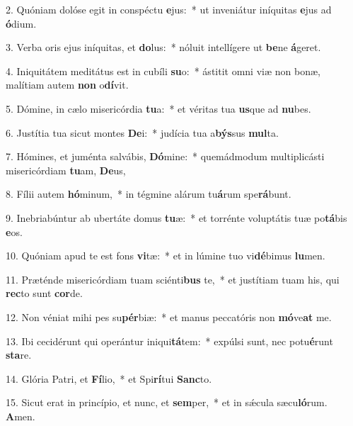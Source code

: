 2. Quóniam dolóse egit in conspéctu \textbf{e}jus:~*  ut inveniátur iníquitas \textbf{e}jus ad \textbf{ó}dium.\

3. Verba oris ejus iníquitas, et \textbf{do}lus:~*  nóluit intellígere ut \textbf{be}ne \textbf{á}geret.\

4. Iniquitátem meditátus est in cubíli \textbf{su}o:~*  ástitit omni viæ non bonæ, malítiam autem \textbf{non} o\textbf{dí}vit.\

5. Dómine, in cælo misericórdia \textbf{tu}a:~*  et véritas tua \textbf{us}que ad \textbf{nu}bes.\

6. Justítia tua sicut montes \textbf{De}i:~*  judícia tua a\textbf{býs}sus \textbf{mul}ta.\

7. Hómines, et juménta salvábis, \textbf{Dó}mine:~*  quemádmodum multiplicásti misericórdiam \textbf{tu}am, \textbf{De}us,\

8. Fílii autem \textbf{hó}minum,~*  in tégmine alárum tu\textbf{á}rum spe\textbf{rá}bunt.\

9. Inebriabúntur ab ubertáte domus \textbf{tu}æ:~*  et torrénte voluptátis tuæ po\textbf{tá}bis \textbf{e}os.\

10. Quóniam apud te est fons \textbf{vi}tæ:~*  et in lúmine tuo vi\textbf{dé}bimus \textbf{lu}men.\

11. Præténde misericórdiam tuam sciénti\textbf{bus} te,~*  et justítiam tuam his, qui \textbf{rec}to sunt \textbf{cor}de.\

12. Non véniat mihi pes su\textbf{pér}biæ:~*  et manus peccatóris non \textbf{mó}ve\textbf{at} me.\

13. Ibi cecidérunt qui operántur iniqui\textbf{tá}tem:~*  expúlsi sunt, nec potu\textbf{é}runt \textbf{sta}re.\

14. Glória Patri, et \textbf{Fí}lio,~*  et Spi\textbf{rí}tui \textbf{Sanc}to.\

15. Sicut erat in princípio, et nunc, et \textbf{sem}per,~*  et in sǽcula sæcu\textbf{ló}rum. \textbf{A}men.\

